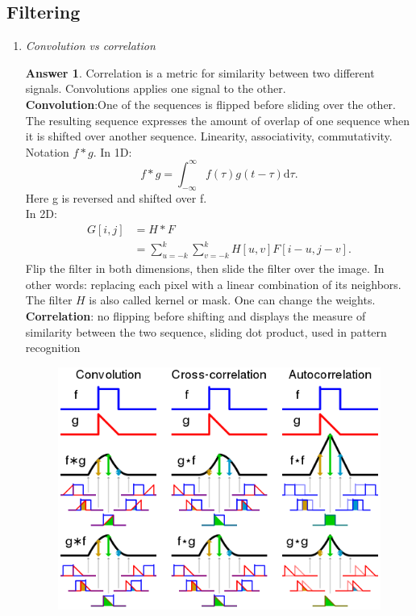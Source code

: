 \documentclass[a4paper,12 pt]{article}
\theoremstyle{definition}
\theoremstyle{remark}
\theoremstyle{definition}
\theoremstyle{definition}
\theoremstyle{definition}
\theoremstyle{definition}
\theoremstyle{remark}
\theoremstyle{remark}
\theoremstyle{definition}
\theoremstyle{definition}
\newtheorem*{answer}{Answer}
\begin{document}
\subsection*{Filtering}
\begin{enumerate}
\item \textit{Convolution vs correlation}
\begin{answer}
Correlation is a metric for similarity between two different signals. Convolutions applies one signal to the other. \\
\textbf{Convolution}:One of the sequences is flipped before sliding over the other. The resulting sequence expresses the amount of overlap of one sequence when it is shifted over another sequence. Linearity, associativity, commutativity. Notation $f*g$. In 1D:
\begin{equation}
f*g=\int_{-\infty}^{\infty}f(\tau)g(t-\tau)\text{d}\tau.
\end{equation}
Here g is reversed and shifted over f.\\
In 2D:
\begin{equation}
\begin{split}
G[i,j]&=H*F\\
&=\sum_{u=-k}^k\sum_{v=-k}^{k} H[u,v]F[i-u,j-v].
\end{split}
\end{equation}
Flip the filter in both dimensions, then slide the filter over the image. In other words: replacing each pixel with a linear combination of its neighbors. The filter $H$ is also called kernel or mask. One can change the weights.\\
\textbf{Correlation}: no flipping before shifting and displays the measure of similarity between the two sequence, sliding dot product, used in pattern recognition
\begin{figure}[h!]
\begin{center}
\includegraphics[scale=0.4]{pics/convolution}

\end{center}
\end{figure}
\end{answer}
\end{enumerate}
\end{document}
